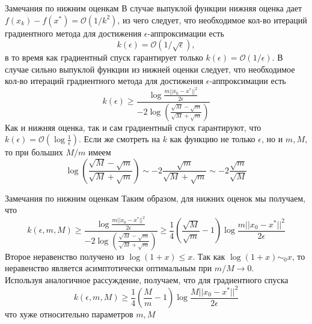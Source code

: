 \documentclass[10pt, handout]{beamer}
\begin{document}
\begin{frame}{Замечания по нижним оценкам}
В случае выпуклой функции нижняя оценка дает $f(x_k)-f(x^*)=\mathcal{O}(1/k^2)$, из чего следует, что необходимое кол-во итераций градиентного метода для достижения $\epsilon$-аппроксимации есть 
$$
k(\epsilon)=\mathcal{O}(1/\sqrt{\epsilon}),
$$
в то время как градиентный спуск гарантирует только $k(\epsilon)=\mathcal{O}(1/\epsilon)$.
\pause
В случае сильно выпуклой функции из нижней оценки следует, что необходимое кол-во итераций градиентного метода для достижения $\epsilon$-аппроксимации есть 
\begin{equation}\label{strong_convex_converge}
k(\epsilon)\geq \frac{\log\frac{m||x_0-x^*||^2}{2\epsilon}}{-2\log\left(\frac{\sqrt{M}-\sqrt{m}}{\sqrt{M}+\sqrt{m}}\right)}
\end{equation}
Как и нижняя оценка, так и сам градиентный спуск гарантируют, что $k(\epsilon)=\mathcal{O}(\log\frac{1}{\epsilon})$. Если же смотреть на $k$ как функцию не только $\epsilon$, но и $m, M$, то при больших $M/m$ имеем
$$
\log \left(\frac{\sqrt{M}-\sqrt{m}}{\sqrt{M}+\sqrt{m}}\right)\sim -2\frac{\sqrt{m}}{\sqrt{M}+\sqrt{m}}\sim -2\frac{\sqrt{m}}{\sqrt{M}}
$$
\end{frame}

\begin{frame}{Замечания по нижним оценкам}
Таким образом, для нижних оценок мы получаем, что
$$
k(\epsilon, m, M)\geq \frac{\log\frac{m||x_0-x^*||^2}{2\epsilon}}{-2\log\left(\frac{\sqrt{M}-\sqrt{m}}{\sqrt{M}+\sqrt{m}}\right)}\geq \frac{1}{4}\left(\frac{\sqrt{M}}{\sqrt{m}}-1\right)\log\frac{m||x_0-x^*||^2}{2\epsilon}
$$
\pause
Второе неравенство получено из $\log(1+x)\leq x$. Так как $\log(1+x)\sim_0 x$, то неравенство является асимптотически оптимальным при $m/M\rightarrow 0$.\\
\vspace{1em}
\pause 
Используя аналогичное рассуждение, получаем, что для градиентного спуска
$$
k(\epsilon, m, M)\geq \frac{1}{4}\left(\frac{M}{m}-1\right)\log\frac{M||x_0-x^*||^2}{2\epsilon}
$$
что хуже относительно параметров $m, M$
\end{frame}
\end{document}
